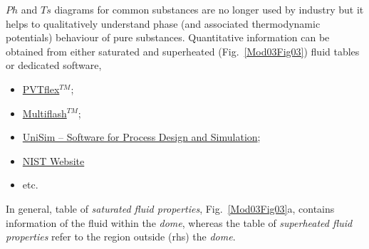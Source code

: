  $Ph$ and $Ts$ diagrams for common substances are no longer used by industry but it helps to qualitatively understand phase (and associated thermodynamic potentials) behaviour of pure substances. Quantitative information can be obtained from either saturated and superheated (Fig.~\ref{Mod03Fig03}) fluid tables or dedicated software, \eg
\begin{itemize}
   \item \href{http://www.weatherford.com/doc/wft183650}{PVTflex$^{TM}$};
   \item \href{http://www.kbcat.com/infochem-software/flow-assurance-software-multiflash/pvt-simulation}{Multiflash$^{TM}$};
   \item \href{https://www.honeywellprocess.com/en-US/explore/products/advanced-applications/unisim/Pages/default.aspx}{UniSim – Software for Process Design and Simulation};
   \item \href{http://webbook.nist.gov/chemistry/fluid/}{NIST Website}
   \item etc.
\end{itemize}
In general, table of {\it saturated fluid properties}, Fig.~\ref{Mod03Fig03}a, contains information of the fluid within the {\it dome}, whereas the table of {\it superheated fluid properties} refer to the region outside (rhs) the {\it dome}. 
%
